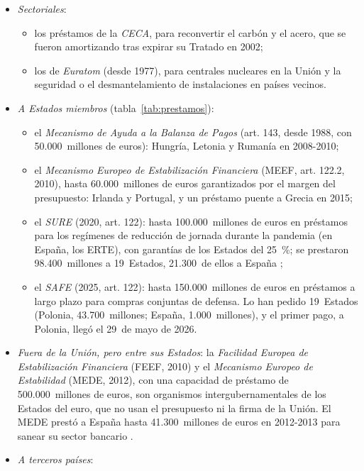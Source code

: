 \documentclass[11pt]{article}
\begin{document}
\begin{itemize}
\item \emph{Sectoriales}:
  \begin{itemize}
  \item los préstamos de la \emph{CECA}, para reconvertir el carbón y el acero, que se fueron amortizando tras expirar su Tratado en 2002;
  \item los de \emph{Euratom} (desde 1977), para centrales nucleares en la Unión y la seguridad o el desmantelamiento de instalaciones en países vecinos.
  \end{itemize}
\item \emph{A Estados miembros} (tabla~\ref{tab:prestamos}):
  \begin{itemize}
  \item el \emph{Mecanismo de Ayuda a la Balanza de Pagos} (art. 143, desde 1988, con 50.000~millones de euros): Hungría, Letonia y Rumanía en 2008-2010;
  \item el \emph{Mecanismo Europeo de Estabilización Financiera} (MEEF, art. 122.2, 2010), hasta 60.000~millones de euros garantizados por el margen del presupuesto: Irlanda y Portugal, y un préstamo puente a Grecia en 2015;
  \item el \emph{SURE} (2020, art. 122): hasta 100.000~millones de euros en préstamos para los regímenes de reducción de jornada durante la pandemia (en España, los ERTE), con garantías de los Estados del 25~\%; se prestaron 98.400~millones a 19~Estados, 21.300~de ellos a España ;
  \item el \emph{SAFE} (2025, art. 122): hasta 150.000~millones de euros en préstamos a largo plazo para compras conjuntas de defensa\nocite{UE2025SAFE}. Lo han pedido 19~Estados (Polonia, 43.700~millones; España, 1.000~millones), y el primer pago, a Polonia, llegó el 29~de mayo de 2026\nocite{CE2026SAFE}.
  \end{itemize}
\item \emph{Fuera de la Unión, pero entre sus Estados}: la \emph{Facilidad Europea de Estabilización Financiera} (FEEF, 2010) y el \emph{Mecanismo Europeo de Estabilidad} (MEDE, 2012), con una capacidad de préstamo de 500.000~millones de euros, son organismos intergubernamentales de los Estados del euro, que no usan el presupuesto ni la firma de la Unión. El MEDE prestó a España hasta 41.300~millones de euros en 2012-2013 para sanear su sector bancario .
\item \emph{A terceros países}:
  \begin{itemize}

\end{itemize}
\end{itemize}
\end{document}
